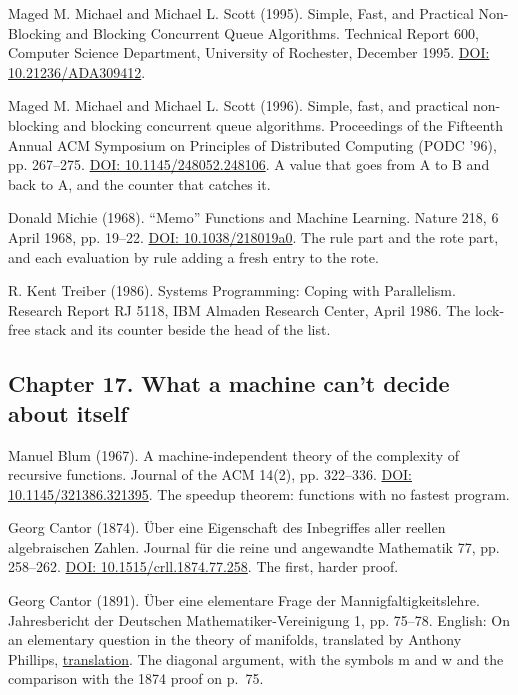 \documentclass[11pt,twoside]{article}
\theoremstyle{thielethm}
\theoremstyle{thieledef}
\theoremstyle{thieledef}
\theoremstyle{thieledef}
\theoremstyle{thielethm}
\theoremstyle{thieleobs}
\theoremstyle{thielethm}
\begin{document}
\noindent Maged M. Michael and Michael L. Scott (1995). Simple, Fast, and Practical Non-Blocking and Blocking Concurrent Queue Algorithms. Technical Report 600, Computer Science Department, University of Rochester, December 1995. \href{https://doi.org/10.21236/ADA309412}{DOI: 10.21236/ADA309412}.
\par\medskip

\noindent Maged M. Michael and Michael L. Scott (1996). Simple, fast, and practical non-blocking and blocking concurrent queue algorithms. Proceedings of the Fifteenth Annual ACM Symposium on Principles of Distributed Computing (PODC '96), pp. 267--275. \href{https://doi.org/10.1145/248052.248106}{DOI: 10.1145/248052.248106}. A value that goes from A to B and back to A, and the counter that catches it.
\par\medskip

\noindent Donald Michie (1968). ``Memo'' Functions and Machine Learning. Nature 218, 6 April 1968, pp. 19--22. \href{https://doi.org/10.1038/218019a0}{DOI: 10.1038/218019a0}. The rule part and the rote part, and each evaluation by rule adding a fresh entry to the rote.
\par\medskip

\noindent R. Kent Treiber (1986). Systems Programming: Coping with Parallelism. Research Report RJ 5118, IBM Almaden Research Center, April 1986. The lock-free stack and its counter beside the head of the list.
\par\medskip

\subsection*{Chapter 17. What a machine can't decide about itself}

\noindent Manuel Blum (1967). A machine-independent theory of the complexity of recursive functions. Journal of the ACM 14(2), pp. 322--336. \href{https://doi.org/10.1145/321386.321395}{DOI: 10.1145/321386.321395}. The speedup theorem: functions with no fastest program.
\par\medskip

\noindent Georg Cantor (1874). \"Uber eine Eigenschaft des Inbegriffes aller reellen algebraischen Zahlen. Journal f\"ur die reine und angewandte Mathematik 77, pp. 258--262. \href{https://doi.org/10.1515/crll.1874.77.258}{DOI: 10.1515/crll.1874.77.258}. The first, harder proof.
\par\medskip

\noindent Georg Cantor (1891). \"Uber eine elementare Frage der Mannigfaltigkeitslehre. Jahresbericht der Deutschen Mathematiker-Vereinigung 1, pp. 75--78. English: On an elementary question in the theory of manifolds, translated by Anthony Phillips, \href{https://math.stonybrook.edu/~tony/archive/336f06/cantor/cantor.html}{translation}. The diagonal argument, with the symbols m and w and the comparison with the 1874 proof on p.~75.
\par\medskip
\end{document}
